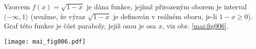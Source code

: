 \begin{mdframed}[style=mdexam]
  \begin{example}\label{MAI:exam018} 
    Vzorcem $f(x)=\sqrt{1-x}$ je dána funkce, jejímž přirozeným oborem je interval 
    $(-\infty,1\rangle$ (uvažme, že výraz $\sqrt{1-x}$ je definován v reálném oboru, je-li 
    $1-x\geq0$). Graf této funkce je část paraboly, jejíž osou je osa $x$, viz obr. 
    \ref{mai:fig006}.
    
    {\centering
    \captionsetup{type=figure}
    \texttt{[image: mai\_fig006.pdf]}
    \label{mai:fig006}
    \par}
  \end{example}
\end{mdframed}